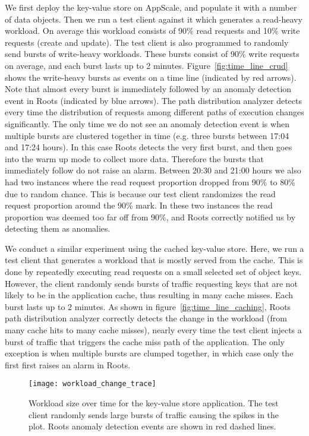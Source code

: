 We first deploy the key-value store on AppScale, and populate it with a number of data objects. Then we
run a test client against it which generates a read-heavy workload. On average this workload
consists of 90\% read requests and 10\% write requests (create and update). The test client
is also programmed to randomly send bursts of write-heavy workloads. These bursts consist
of 90\% write requests on average, and each burst lasts up to 2 minutes. Figure~\ref{fig:time_line_crud}
shows the write-heavy bursts as events on a time line (indicated by red arrows). Note that almost every burst is
immediately followed by an anomaly detection event in Roots (indicated by blue arrows). The path
distribution analyzer detects every time the distribution of requests among different paths of execution
changes significantly. The only time we do not see an anomaly detection event is when multiple
bursts are clustered together in time (e.g. three bursts between 17:04 and 17:24 hours). In this
case Roots detects the very first burst, and then goes into the warm up mode to collect more data. Therefore
the bursts that immediately follow do not raise an alarm. Between 20:30 and 21:00 hours we also
had two instances where the read request proportion dropped from 90\% to 80\% due to random
chance. This is because our test client randomizes the read request proportion around the 90\% mark. 
In these two instances the read proportion was deemed too far off from 90\%, and Roots correctly notified us by 
detecting them as anomalies.

We conduct a similar experiment using the cached key-value store. Here, we run a test client that generates a workload
that is mostly served from the cache. This is done by repeatedly executing read requests on a small
selected set of object keys. However, the client randomly sends bursts of traffic requesting keys that
are not likely to be in the application cache, thus resulting in many cache misses. Each burst
lasts up to 2 minutes. As shown in 
figure~\ref{fig:time_line_caching}, Roots path distribution analyzer correctly detects the change 
in the workload (from many cache hits to many cache misses), nearly every time the test client injects a 
burst of traffic that triggers the cache miss path of the application. The only exception is when
multiple bursts are clumped together, in which case only the first first raises an alarm in Roots.

\begin{figure}
\centering
\texttt{[image: workload\_change\_trace]}
\caption{Workload size over time for the key-value store application. The test client randomly sends
large bursts of traffic causing the spikes in the plot. Roots anomaly detection events are shown
in red dashed lines.}
\label{fig:workload_change}
\end{figure}

